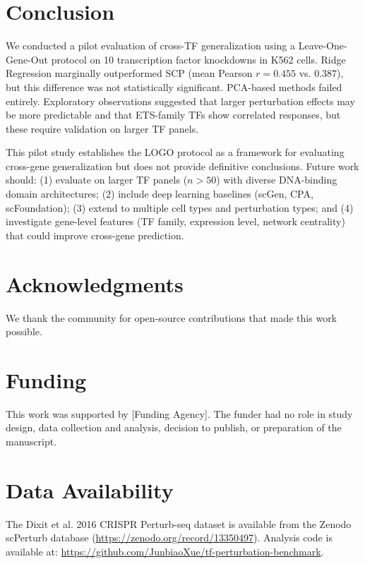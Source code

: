 \documentclass[12pt,number,sort&compress]{elsarticle}
\begin{document}
\clearpage

\section{Conclusion}
\label{sec:conclusion}

We conducted a pilot evaluation of cross-TF generalization using a Leave-One-Gene-Out
protocol on 10 transcription factor knockdowns in K562 cells. Ridge Regression
marginally outperformed SCP (mean Pearson $r = 0.455$ vs. $0.387$), but this
difference was not statistically significant. PCA-based methods failed entirely.
Exploratory observations suggested that larger perturbation effects may be more
predictable and that ETS-family TFs show correlated responses, but these require
validation on larger TF panels.

This pilot study establishes the LOGO protocol as a framework for evaluating
cross-gene generalization but does not provide definitive conclusions. Future
work should: (1) evaluate on larger TF panels ($n > 50$) with diverse
DNA-binding domain architectures; (2) include deep learning baselines (scGen,
CPA, scFoundation); (3) extend to multiple cell types and perturbation types;
and (4) investigate gene-level features (TF family, expression level, network
centrality) that could improve cross-gene prediction.

\clearpage

\section*{Acknowledgments}

We thank the community for open-source contributions that made this work possible.

\section*{Funding}

This work was supported by [Funding Agency]. The funder had no role in
study design, data collection and analysis, decision to publish, or
preparation of the manuscript.

\section*{Data Availability}

The Dixit et al. 2016 CRISPR Perturb-seq dataset is available from the Zenodo
scPerturb database (\url{https://zenodo.org/record/13350497}).
Analysis code is available at:
\url{https://github.com/JunbiaoXue/tf-perturbation-benchmark}.

\clearpage



\end{document}
